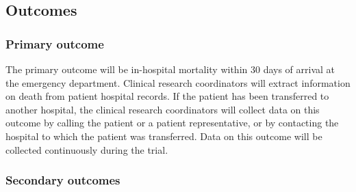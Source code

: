 \documentclass[
]{scrartcl}
\begin{document}
\hypertarget{outcomes}{%
\subsection{Outcomes}\label{outcomes}}

\hypertarget{primary-outcome}{%
\subsubsection{Primary outcome}\label{primary-outcome}}

The primary outcome will be in-hospital mortality within 30 days of
arrival at the emergency department. Clinical research coordinators will
extract information on death from patient hospital records. If the
patient has been transferred to another hospital, the clinical research
coordinators will collect data on this outcome by calling the patient or
a patient representative, or by contacting the hospital to which the
patient was transferred. Data on this outcome will be collected
continuously during the trial.

\hypertarget{secondary-outcomes}{%
\subsubsection{Secondary outcomes}\label{secondary-outcomes}}
\end{document}
